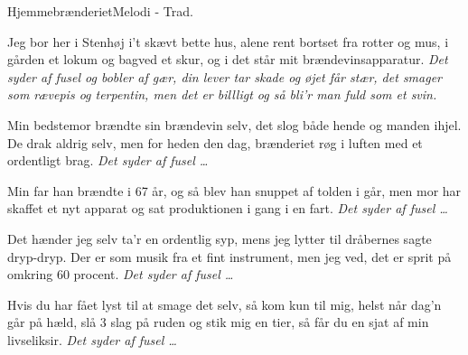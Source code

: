 \begin{sang}{Hjemmebrænderiet}{Melodi - Trad.}
\begin{vers}
Jeg bor her i Stenhøj i't skævt bette hus,
alene rent bortset fra rotter og mus,
i gården et lokum og bagved et skur,
og i det står mit brændevinsapparatur.
{\em Det syder af fusel og bobler af gær,
din lever tar skade og øjet får stær,
det smager som rævepis og terpentin,
men det er billligt og så bli'r man fuld som et svin.}
\end{vers}
\begin{vers}
Min bedstemor brændte sin brændevin selv,
det slog både hende og manden ihjel. 
De drak aldrig selv, men for heden den dag,
brænderiet røg i luften med et ordentligt brag.
{\em Det syder af fusel \ldots}
\end{vers}
\begin{vers}
Min far han brændte i 67 år, 
og så blev han snuppet af tolden i går,
men mor har skaffet et nyt apparat   
og sat produktionen i gang i en fart.
{\em Det syder af fusel \ldots}
\end{vers}
\begin{vers}
Det hænder jeg selv ta'r en ordentlig syp,
mens jeg lytter til dråbernes sagte dryp-dryp.
Der er som musik fra et fint instrument,
men jeg ved, det er sprit på omkring 60 procent.
{\em Det syder af fusel \ldots}
\end{vers}
\begin{vers}
Hvis du har fået lyst til at smage det selv,
så kom kun til mig, helst når dag'n går på hæld,
slå 3 slag på ruden og stik mig en tier,
så får du en sjat af min livseliksir.
{\em Det syder af fusel \ldots}
\end{vers}
\vbox{}\vfill
\vbox{}\vfill
\vbox{}\vfill
\vbox{}\vfill
\vbox{}\vfill
\laps
\end{sang}